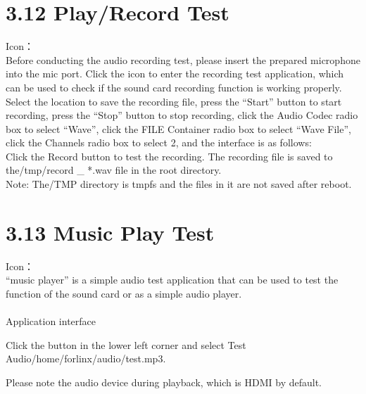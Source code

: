 \documentclass[letterpaper,10pt,openany,english]{sphinxmanual}
\begin{document}
\section{3.12 Play/Record Test}
\label{\detokenize{linux-manual:play-record-test}}
\sphinxAtStartPar
Icon：\\
Before conducting the audio recording test, please insert the prepared microphone into the mic port. Click the icon to enter the recording test application, which can be used to check if the sound card recording function is working properly.\\
Select the location to save the recording file, press the “Start” button to start recording, press the “Stop” button to stop recording, click the Audio Codec radio box to select “Wave”, click the FILE Container radio box to select “Wave File”, click the Channels radio box to select 2, and the interface is as follows:\\
Click the Record button to test the recording. The recording file is saved to the/tmp/record \_ *.wav file in the root directory.\\
Note: The/TMP directory is tmpfs and the files in it are not saved after reboot.


\section{3.13 Music Play Test}
\label{\detokenize{linux-manual:music-play-test}}
\sphinxAtStartPar
Icon：\\
“music player” is a simple audio test application that can be used to test the function of the sound card or as a simple audio player.\\
\\
Application interface

\sphinxAtStartPar
Click the button in the lower left corner and select Test Audio/home/forlinx/audio/test.mp3.

\sphinxAtStartPar
Please note the audio device during playback, which is HDMI by default.
\end{document}
